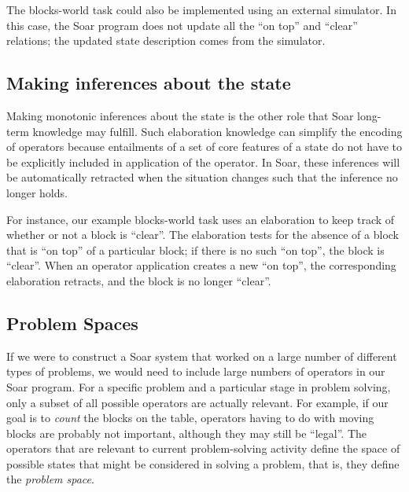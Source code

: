 The blocks-world task could also be implemented using an external simulator. In this case,
the Soar program does not update all the ``on top'' and ``clear'' relations;
the updated state description comes from the simulator.

\subsection{Making inferences about the state}

Making monotonic inferences about the state is the other role that Soar
long-term knowledge may fulfill. Such elaboration knowledge can simplify
the encoding of operators because entailments of a set of core features
of a state do not have to be explicitly included in application of the
operator.  In Soar, these inferences will be automatically retracted
when the situation changes such that the inference no longer holds.

For instance, our example blocks-world task uses an elaboration to keep track
of whether or not a block is ``clear''. The elaboration tests for the absence
of a block that is ``on top'' of a particular block; if there is no such ``on top'',
the block is ``clear''. When an operator application creates a new ``on top'', the
corresponding elaboration retracts, and the block is no longer ``clear''.


\subsection{Problem Spaces}
\label{ARCH-functions-ps}

If we were to construct a Soar system that worked on a large number of
different types of problems, we would need to include large numbers of
operators in our Soar program. For a specific problem and a
particular stage in problem solving, only a subset of all possible operators
are actually relevant. For example, if our goal is to \textit{count} the
blocks on the table, operators having to do with moving blocks are probably
not important, although they may still be ``legal''. The operators that are
relevant to current problem-solving activity define the space of possible
states that might be considered in solving a problem, that is, they define the
\emph{problem space}.

